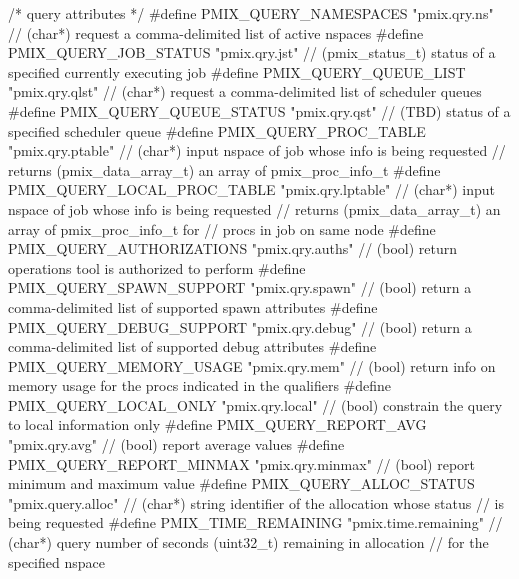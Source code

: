 \begin{codepar}
/* query attributes */
#define PMIX_QUERY_NAMESPACES               "pmix.qry.ns"           // (char*) request a comma-delimited list of active nspaces
#define PMIX_QUERY_JOB_STATUS               "pmix.qry.jst"          // (pmix_status_t) status of a specified currently executing job
#define PMIX_QUERY_QUEUE_LIST               "pmix.qry.qlst"         // (char*) request a comma-delimited list of scheduler queues
#define PMIX_QUERY_QUEUE_STATUS             "pmix.qry.qst"          // (TBD) status of a specified scheduler queue
#define PMIX_QUERY_PROC_TABLE               "pmix.qry.ptable"       // (char*) input nspace of job whose info is being requested
                                                                    //         returns (pmix_data_array_t) an array of pmix_proc_info_t
#define PMIX_QUERY_LOCAL_PROC_TABLE         "pmix.qry.lptable"      // (char*) input nspace of job whose info is being requested
                                                                    //         returns (pmix_data_array_t) an array of pmix_proc_info_t for
                                                                    //         procs in job on same node
#define PMIX_QUERY_AUTHORIZATIONS           "pmix.qry.auths"        // (bool) return operations tool is authorized to perform
#define PMIX_QUERY_SPAWN_SUPPORT            "pmix.qry.spawn"        // (bool) return a comma-delimited list of supported spawn attributes
#define PMIX_QUERY_DEBUG_SUPPORT            "pmix.qry.debug"        // (bool) return a comma-delimited list of supported debug attributes
#define PMIX_QUERY_MEMORY_USAGE             "pmix.qry.mem"          // (bool) return info on memory usage for the procs indicated in the qualifiers
#define PMIX_QUERY_LOCAL_ONLY               "pmix.qry.local"        // (bool) constrain the query to local information only
#define PMIX_QUERY_REPORT_AVG               "pmix.qry.avg"          // (bool) report average values
#define PMIX_QUERY_REPORT_MINMAX            "pmix.qry.minmax"       // (bool) report minimum and maximum value
#define PMIX_QUERY_ALLOC_STATUS             "pmix.query.alloc"      // (char*) string identifier of the allocation whose status
                                                                    //         is being requested
#define PMIX_TIME_REMAINING                 "pmix.time.remaining"   // (char*) query number of seconds (uint32_t) remaining in allocation
                                                                    //         for the specified nspace


\end{codepar}
